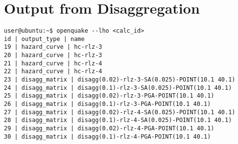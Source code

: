 \section{Output from Disaggregation}


\begin{Verbatim}[frame=single, commandchars=\\\{\}, samepage=true]
user@ubuntu:~$ openquake --lho <calc_id> 
id | output_type | name
19 | hazard_curve | hc-rlz-3
20 | hazard_curve | hc-rlz-3
21 | hazard_curve | hc-rlz-4
22 | hazard_curve | hc-rlz-4
23 | disagg_matrix | disagg(0.02)-rlz-3-SA(0.025)-POINT(10.1 40.1)
24 | disagg_matrix | disagg(0.1)-rlz-3-SA(0.025)-POINT(10.1 40.1)
25 | disagg_matrix | disagg(0.02)-rlz-3-PGA-POINT(10.1 40.1)
26 | disagg_matrix | disagg(0.1)-rlz-3-PGA-POINT(10.1 40.1)
27 | disagg_matrix | disagg(0.02)-rlz-4-SA(0.025)-POINT(10.1 40.1)
28 | disagg_matrix | disagg(0.1)-rlz-4-SA(0.025)-POINT(10.1 40.1)
29 | disagg_matrix | disagg(0.02)-rlz-4-PGA-POINT(10.1 40.1)
30 | disagg_matrix | disagg(0.1)-rlz-4-PGA-POINT(10.1 40.1)
\end{Verbatim}
